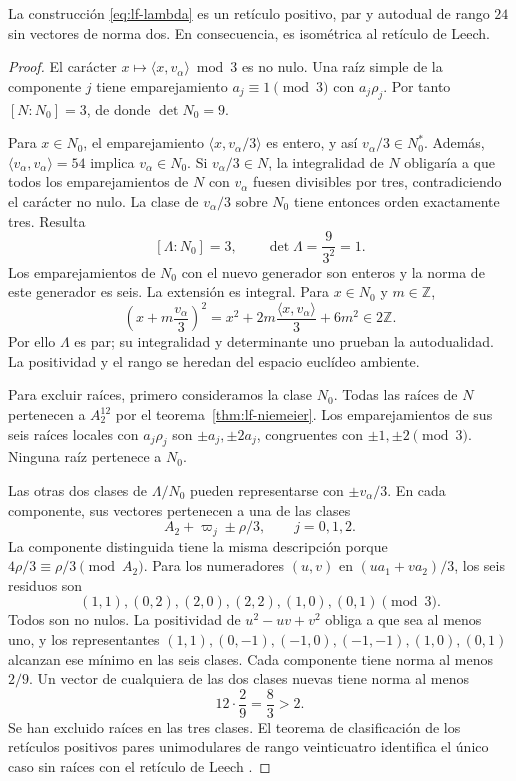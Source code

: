 \begin{theorem}
\label{thm:lf-leech}
La construcción \eqref{eq:lf-lambda} es un
retículo positivo, par y autodual de rango \(24\)
sin vectores de norma dos. En consecuencia, es
isométrica al retículo de Leech.
\end{theorem}
\begin{proof}
El carácter \(x\mapsto\langle x,v_\alpha\rangle\bmod3\)
es no nulo. Una raíz simple de la componente \(j\)
tiene emparejamiento \(a_j\equiv1\pmod3\) con
\(a_j\rho_j\). Por tanto \([N:N_0]=3\), de donde
\(\det N_0=9\).

Para \(x\in N_0\), el emparejamiento
\(\langle x,v_\alpha/3\rangle\) es entero, y así
\(v_\alpha/3\in N_0^*\). Además,
\(\langle v_\alpha,v_\alpha\rangle=54\) implica
\(v_\alpha\in N_0\). Si \(v_\alpha/3\in N\),
la integralidad de \(N\) obligaría a que todos los
emparejamientos de \(N\) con \(v_\alpha\) fuesen
divisibles por tres, contradiciendo el carácter
no nulo. La clase de \(v_\alpha/3\) sobre \(N_0\)
tiene entonces orden exactamente tres. Resulta
\[
 [\Lambda:N_0]=3,\qquad
 \det\Lambda=\frac9{3^2}=1.
\]
Los emparejamientos de \(N_0\) con el nuevo
generador son enteros y la norma de este generador
es seis. La extensión es integral. Para
\(x\in N_0\) y \(m\in\mathbb Z\),
\[
 \left(x+m\frac{v_\alpha}{3}\right)^2
 =x^2+2m\frac{\langle x,v_\alpha\rangle}{3}
       +6m^2\in2\mathbb Z.
\]
Por ello \(\Lambda\) es par; su integralidad y
determinante uno prueban la autodualidad.
La positividad y el rango se heredan del espacio
euclídeo ambiente.

Para excluir raíces, primero consideramos la
clase \(N_0\). Todas las raíces de \(N\) pertenecen
a \(A_2^{12}\) por el teorema~\ref{thm:lf-niemeier}.
Los emparejamientos de sus seis raíces locales
con \(a_j\rho_j\) son \(\pm a_j,\pm2a_j\),
congruentes con \(\pm1,\pm2\pmod3\).
Ninguna raíz pertenece a \(N_0\).

Las otras dos clases de \(\Lambda/N_0\) pueden
representarse con \(\pm v_\alpha/3\).
En cada componente, sus vectores pertenecen a
una de las clases
\[
 A_2+\varpi_j\pm\rho/3,\qquad j=0,1,2.
\]
La componente distinguida tiene la misma
descripción porque \(4\rho/3\equiv\rho/3\pmod{A_2}\).
Para los numeradores \((u,v)\) en
\((ua_1+va_2)/3\), los seis residuos son
\[
 (1,1),(0,2),(2,0),(2,2),(1,0),(0,1)\pmod3.
\]
Todos son no nulos. La positividad de
\(u^2-uv+v^2\) obliga a que sea al menos uno,
y los representantes
\((1,1),(0,-1),(-1,0),(-1,-1),(1,0),(0,1)\)
alcanzan ese mínimo en las seis clases.
Cada componente tiene norma al menos \(2/9\).
Un vector de cualquiera de las dos clases
nuevas tiene norma al menos
\[
 12\cdot\frac29=\frac83>2.
\]
Se han excluido raíces en las tres clases.
El teorema de clasificación de los retículos
positivos pares unimodulares de rango veinticuatro
identifica el único caso sin raíces con el
retículo de Leech \cite{ConwaySloane}.
\end{proof}

